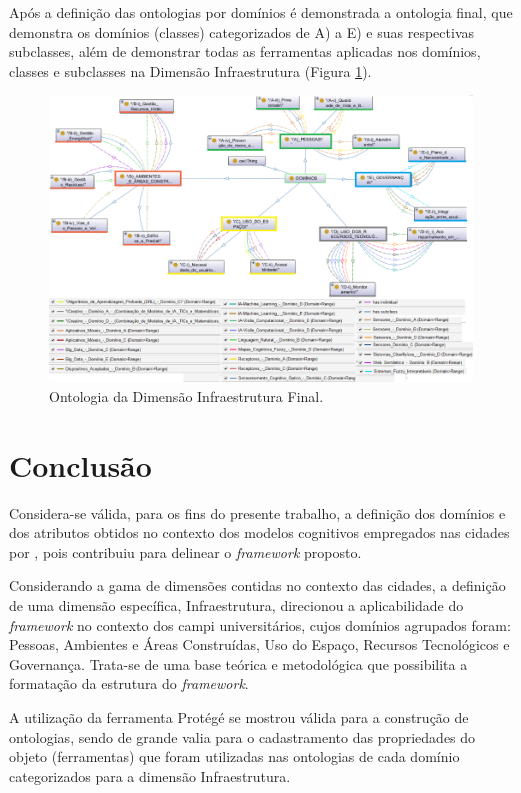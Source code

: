\documentclass[portuguese]{textolivre}
\begin{document}
Após a definição das ontologias por domínios é demonstrada a ontologia final, que demonstra os domínios (classes) categorizados de A) a E) e suas respectivas subclasses, além de demonstrar todas as ferramentas aplicadas nos domínios, classes e subclasses na Dimensão Infraestrutura (Figura \ref{fig-10}).

\begin{figure}[h!]
    \centering
    \includegraphics[width=0.95\linewidth]{images/FIGURA10.png}
    \caption{Ontologia da Dimensão Infraestrutura Final.}
    \label{fig-10}
\end{figure}

\section{Conclusão}

Considera-se válida, para os fins do presente trabalho, a definição dos domínios e dos atributos obtidos no contexto dos modelos cognitivos empregados nas cidades por \cite{giuriatti2024}, pois contribuiu para delinear o \textit{framework} proposto.

Considerando a gama de dimensões contidas no contexto das cidades, a definição de uma dimensão específica, Infraestrutura, direcionou a aplicabilidade do \textit{framework} no contexto dos campi universitários, cujos domínios agrupados foram: Pessoas, Ambientes e Áreas Construídas, Uso do Espaço, Recursos Tecnológicos e Governança. Trata-se de uma base teórica e metodológica que possibilita a formatação da estrutura do \textit{framework}.

A utilização da ferramenta Protégé se mostrou válida para a construção de ontologias, sendo de grande valia para o cadastramento das propriedades do objeto (ferramentas) que foram utilizadas nas ontologias de cada domínio categorizados para a dimensão Infraestrutura.
\end{document}
